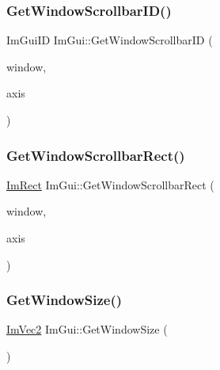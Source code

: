 \subsubsection{\texorpdfstring{Get\+Window\+Scrollbar\+I\+D()}{GetWindowScrollbarID()}}
{\footnotesize\ttfamily Im\+Gui\+ID Im\+Gui\+::\+Get\+Window\+Scrollbar\+ID (\begin{DoxyParamCaption}\item[{\hyperlink{structImGuiWindow}{Im\+Gui\+Window} $\ast$}]{window,  }\item[{\hyperlink{imgui__internal_8h_a468e54d5ed387abfbf0d1fc1e33ab483}{Im\+Gui\+Axis}}]{axis }\end{DoxyParamCaption})}

\mbox{\label{namespaceImGui_ab0be56f97f06487343342a8d99261409}} 
\subsubsection{\texorpdfstring{Get\+Window\+Scrollbar\+Rect()}{GetWindowScrollbarRect()}}
{\footnotesize\ttfamily \hyperlink{structImRect}{Im\+Rect} Im\+Gui\+::\+Get\+Window\+Scrollbar\+Rect (\begin{DoxyParamCaption}\item[{\hyperlink{structImGuiWindow}{Im\+Gui\+Window} $\ast$}]{window,  }\item[{\hyperlink{imgui__internal_8h_a468e54d5ed387abfbf0d1fc1e33ab483}{Im\+Gui\+Axis}}]{axis }\end{DoxyParamCaption})}

\mbox{\label{namespaceImGui_aaa5c0bfac7125ba9850a08b6db2e90c9}} 
\subsubsection{\texorpdfstring{Get\+Window\+Size()}{GetWindowSize()}}
{\footnotesize\ttfamily \hyperlink{structImVec2}{Im\+Vec2} Im\+Gui\+::\+Get\+Window\+Size (\begin{DoxyParamCaption}{ }\end{DoxyParamCaption})}

\mbox{\label{namespaceImGui_a471ff23945b99541c506dbdc2a9004cf}} 
